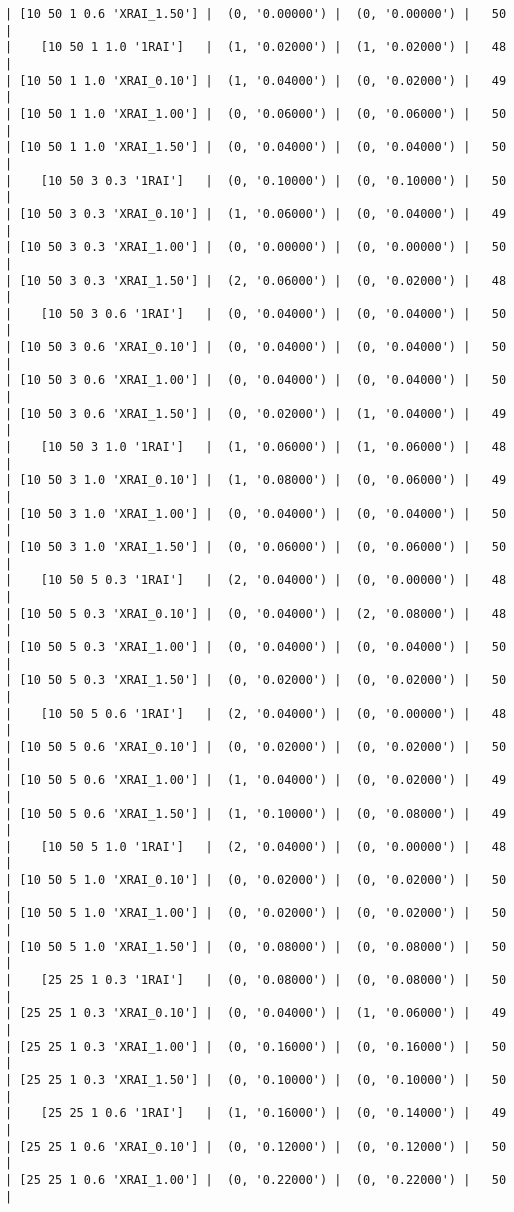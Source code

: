 \documentclass{article}
\begin{document}
\begin{verbatim}
| [10 50 1 0.6 'XRAI_1.50'] |  (0, '0.00000') |  (0, '0.00000') |   50  |
|    [10 50 1 1.0 '1RAI']   |  (1, '0.02000') |  (1, '0.02000') |   48  |
| [10 50 1 1.0 'XRAI_0.10'] |  (1, '0.04000') |  (0, '0.02000') |   49  |
| [10 50 1 1.0 'XRAI_1.00'] |  (0, '0.06000') |  (0, '0.06000') |   50  |
| [10 50 1 1.0 'XRAI_1.50'] |  (0, '0.04000') |  (0, '0.04000') |   50  |
|    [10 50 3 0.3 '1RAI']   |  (0, '0.10000') |  (0, '0.10000') |   50  |
| [10 50 3 0.3 'XRAI_0.10'] |  (1, '0.06000') |  (0, '0.04000') |   49  |
| [10 50 3 0.3 'XRAI_1.00'] |  (0, '0.00000') |  (0, '0.00000') |   50  |
| [10 50 3 0.3 'XRAI_1.50'] |  (2, '0.06000') |  (0, '0.02000') |   48  |
|    [10 50 3 0.6 '1RAI']   |  (0, '0.04000') |  (0, '0.04000') |   50  |
| [10 50 3 0.6 'XRAI_0.10'] |  (0, '0.04000') |  (0, '0.04000') |   50  |
| [10 50 3 0.6 'XRAI_1.00'] |  (0, '0.04000') |  (0, '0.04000') |   50  |
| [10 50 3 0.6 'XRAI_1.50'] |  (0, '0.02000') |  (1, '0.04000') |   49  |
|    [10 50 3 1.0 '1RAI']   |  (1, '0.06000') |  (1, '0.06000') |   48  |
| [10 50 3 1.0 'XRAI_0.10'] |  (1, '0.08000') |  (0, '0.06000') |   49  |
| [10 50 3 1.0 'XRAI_1.00'] |  (0, '0.04000') |  (0, '0.04000') |   50  |
| [10 50 3 1.0 'XRAI_1.50'] |  (0, '0.06000') |  (0, '0.06000') |   50  |
|    [10 50 5 0.3 '1RAI']   |  (2, '0.04000') |  (0, '0.00000') |   48  |
| [10 50 5 0.3 'XRAI_0.10'] |  (0, '0.04000') |  (2, '0.08000') |   48  |
| [10 50 5 0.3 'XRAI_1.00'] |  (0, '0.04000') |  (0, '0.04000') |   50  |
| [10 50 5 0.3 'XRAI_1.50'] |  (0, '0.02000') |  (0, '0.02000') |   50  |
|    [10 50 5 0.6 '1RAI']   |  (2, '0.04000') |  (0, '0.00000') |   48  |
| [10 50 5 0.6 'XRAI_0.10'] |  (0, '0.02000') |  (0, '0.02000') |   50  |
| [10 50 5 0.6 'XRAI_1.00'] |  (1, '0.04000') |  (0, '0.02000') |   49  |
| [10 50 5 0.6 'XRAI_1.50'] |  (1, '0.10000') |  (0, '0.08000') |   49  |
|    [10 50 5 1.0 '1RAI']   |  (2, '0.04000') |  (0, '0.00000') |   48  |
| [10 50 5 1.0 'XRAI_0.10'] |  (0, '0.02000') |  (0, '0.02000') |   50  |
| [10 50 5 1.0 'XRAI_1.00'] |  (0, '0.02000') |  (0, '0.02000') |   50  |
| [10 50 5 1.0 'XRAI_1.50'] |  (0, '0.08000') |  (0, '0.08000') |   50  |
|    [25 25 1 0.3 '1RAI']   |  (0, '0.08000') |  (0, '0.08000') |   50  |
| [25 25 1 0.3 'XRAI_0.10'] |  (0, '0.04000') |  (1, '0.06000') |   49  |
| [25 25 1 0.3 'XRAI_1.00'] |  (0, '0.16000') |  (0, '0.16000') |   50  |
| [25 25 1 0.3 'XRAI_1.50'] |  (0, '0.10000') |  (0, '0.10000') |   50  |
|    [25 25 1 0.6 '1RAI']   |  (1, '0.16000') |  (0, '0.14000') |   49  |
| [25 25 1 0.6 'XRAI_0.10'] |  (0, '0.12000') |  (0, '0.12000') |   50  |
| [25 25 1 0.6 'XRAI_1.00'] |  (0, '0.22000') |  (0, '0.22000') |   50  |

\end{verbatim}
\end{document}
